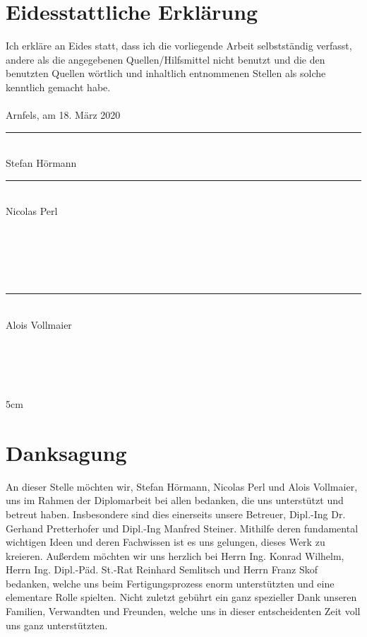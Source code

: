 \frontmatter												%
\addtocounter{page}{2}

\newcommand{\doublesignature}[2]{%
  \parbox{\textwidth}{
    \hfill
    \parbox{7cm}{
      \centering
      \rule{6cm}{1pt}\\
      #1
    }
    \parbox{7cm}{
      \centering
      \rule{6cm}{1pt}\\
      #2
    }
  }
  \mbox{}\\
  \mbox{}\\
  \mbox{}\\
  \mbox{}\\
}
\newcommand{\singlesignature}[2]{%
  \parbox{\textwidth}{
    \hfill
    \parbox{7cm}{
      \centering
      \rule{6cm}{1pt}\\
      #1
    }
  }
  \mbox{}\\
  \mbox{}\\
  \mbox{}\\
  \mbox{}\\
}

\vspace*{20pt}

\section*{Eidesstattliche Erklärung}
\label{sec:eidesstattliche-erklaerung}
Ich erkläre an Eides statt, dass ich die vorliegende Arbeit selbstständig verfasst, andere als die angegebenen
Quellen/Hilfsmittel nicht benutzt und die den benutzten Quellen wörtlich und inhaltlich entnommenen
Stellen als solche kenntlich gemacht habe.\\
\\
Arnfels, am 18. März 2020\\

\vskip 1cm

\doublesignature{Stefan Hörmann}{Nicolas Perl}
\singlesignature{Alois Vollmaier}

\vskip 5cm

\clearpage

\newpage
\thispagestyle{empty}
\mbox{}

\clearpage

\section*{Danksagung}
\label{sec:danksagung}
An dieser Stelle möchten wir, Stefan Hörmann, Nicolas Perl und Alois Vollmaier, uns im Rahmen der Diplomarbeit bei allen bedanken, die uns unterstützt und betreut haben.
Insbesondere sind dies einerseits unsere Betreuer, Dipl.-Ing Dr. Gerhand Pretterhofer und Dipl.-Ing Manfred Steiner.
Mithilfe deren fundamental wichtigen Ideen und deren Fachwissen ist es uns gelungen, dieses Werk zu kreieren.
Außerdem möchten wir uns herzlich bei Herrn Ing. Konrad Wilhelm, Herrn Ing. Dipl.-Päd. St.-Rat Reinhard Semlitsch und Herrn Franz Skof bedanken, welche uns beim Fertigungsprozess enorm unterstützten und eine elementare Rolle spielten.
Nicht zuletzt gebührt ein ganz spezieller Dank unseren Familien, Verwandten und Freunden, welche uns in dieser entscheidenten Zeit voll uns ganz unterstützten.
\clearpage

